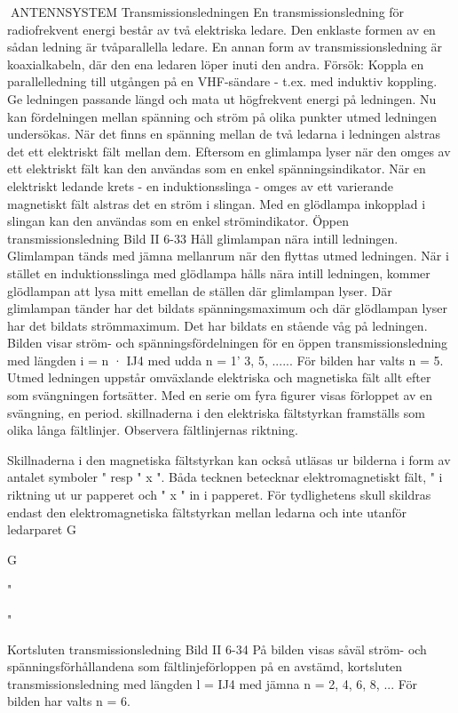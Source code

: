 {{{{ANTENNSYSTEM
Transmissionsledningen
En transmissionsledning för radiofrekvent energi består av två elektriska ledare.
Den enklaste formen av en sådan ledning är
tvåparallella ledare. En annan form av transmissionsledning är koaxialkabeln, där den
ena ledaren löper inuti den andra.
Försök: Koppla en parallelledning till utgången på en VHF-sändare - t.ex. med
induktiv koppling. Ge ledningen passande
längd och mata ut högfrekvent energi på
ledningen. Nu kan fördelningen mellan spänning och ström på olika punkter utmed ledningen undersökas. När det finns en spänning mellan de två ledarna i ledningen alstras det ett elektriskt fält mellan dem.
Eftersom en glimlampa lyser när den
omges av ett elektriskt fält kan den användas som en enkel spänningsindikator.
När en elektriskt ledande krets - en induktionsslinga - omges av ett varierande
magnetiskt fält alstras det en ström i slingan.
Med en glödlampa inkopplad i slingan kan
den användas som en enkel strömindikator.
Öppen transmissionsledning
Bild II 6-33
Håll glimlampan nära intill ledningen.
Glimlampan tänds med jämna mellanrum
när den flyttas utmed ledningen.
När i stället en induktionsslinga med glödlampa hålls nära intill ledningen, kommer
glödlampan att lysa mitt emellan de ställen
där glimlampan lyser. Där glimlampan tänder har det bildats spänningsmaximum och
där glödlampan lyser har det bildats strömmaximum. Det har bildats en stående våg
på ledningen.
Bilden visar ström- och spänningsfördelningen för en öppen transmissionsledning med längden i = n · IJ4 med udda n =
1' 3, 5, ......
För bilden har valts n = 5.
Utmed ledningen uppstår omväxlande
elektriska och magnetiska fält allt efter som
svängningen fortsätter. Med en serie om
fyra figurer visas förloppet av en svängning,
en period. skillnaderna i den elektriska fältstyrkan framställs som olika långa fältlinjer.
Observera fältlinjernas riktning.

Skillnaderna i den magnetiska fältstyrkan
kan också utläsas ur bilderna i form av
antalet symboler "
resp " x ". Båda
tecknen betecknar elektromagnetiskt fält, "
i riktning ut ur papperet och " x " in i
papperet. För tydlighetens skull skildras
endast den elektromagnetiska fältstyrkan
mellan ledarna och inte utanför ledarparet
G

G

"

"

Kortsluten transmissionsledning
Bild II 6-34
På bilden visas såväl ström- och spänningsförhållandena som fältlinjeförloppen
på en avstämd, kortsluten transmissionsledning med längden l = IJ4 med jämna n =
2, 4, 6, 8, ... För bilden har valts n = 6.

}}}}
